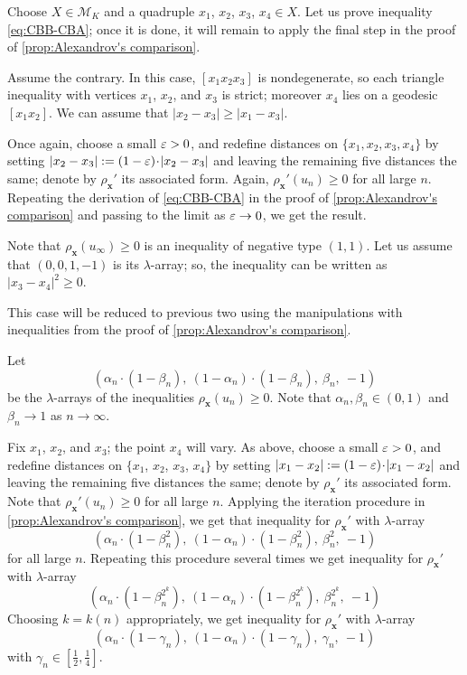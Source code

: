 \documentclass[a4paper,10pt]{article}
\begin{document}
Choose $X\in \mathcal{M}_K$ and a quadruple $x_1$, $x_2$, $x_3$, $x_4\in X$.
Let us prove inequality \ref{eq:CBB-CBA};
once it is done, it will remain to apply the final step in the proof of \ref{prop:Alexandrov's comparison}.

Assume the contrary.
In this case, $[x_1x_2x_3]$ is nondegenerate, so each triangle inequality with vertices $x_1$, $x_2$, and $x_3$ is strict; moreover $x_4$ lies on a geodesic $[x_1x_2]$.
We can assume that $|x_2-x_3|\ge |x_1-x_3|$.

Once again, choose a small $\varepsilon>0$, and redefine distances on $\{x_1,x_2,x_3,x_4\}$ by setting $|x_2-x_3|:=(1-\eps)\cdot|x_2-x_3|$ and leaving the remaining five distances the same; denote by $\rho_{\bm{x}}'$ its associated form.
Again, $\rho_{\bm{x}}'(u_n)\ge0$ for all large $n$.
Repeating the derivation of \ref{eq:CBB-CBA} in the proof of \ref{prop:Alexandrov's comparison} and passing to the limit as $\varepsilon\to 0$, we get the result.

Note that $\rho_{\bm{x}}(u_\infty)\ge0$ is an inequality of negative type $(1,1)$.
Let us assume that $(0,0, 1,-1)$ is its $\lambda$-array;
so, the inequality can be written as $|x_3-x_4|^2\ge 0$.

This case will be reduced to previous two using the manipulations with inequalities from the proof of \ref{prop:Alexandrov's comparison}.

Let
\[(\alpha_n\cdot (1-\beta_n),\  (1-\alpha_n)\cdot(1-\beta_n),\  \beta_n,\ -1)\]
be the $\lambda$-arrays of the inequalities $\rho_{\bm{x}}(u_n)\ge 0$.
Note that $\alpha_n,\beta_n\in(0,1)$ and $\beta_n\to 1$ as $n\to\infty$.

Fix $x_1$, $x_2$, and $x_3$; the point $x_4$ will vary.
As above, choose a small $\varepsilon>0$, and redefine distances on $\{x_1$, $x_2$, $x_3$, $x_4\}$ by setting $|x_1-x_2|\z{\mathrel{:=}}(1-\eps)\cdot|x_1-x_2|$ and leaving the remaining five distances the same; denote by $\rho_{\bm{x}}'$ its associated form.
Note that $\rho_{\bm{x}}'(u_n)\ge0$ for all large $n$.
Applying the iteration procedure in \ref{prop:Alexandrov's comparison}, we get that inequality for $\rho_{\bm{x}}'$ with $\lambda$-array
\[(\alpha_n\cdot (1-\beta_n^2),\  (1-\alpha_n)\cdot(1-\beta_n^2),\  \beta_n^2,\ -1)\]
for all large $n$.
Repeating this procedure several times we get inequality for $\rho_{\bm{x}}'$ with $\lambda$-array
\[(\alpha_n\cdot (1-\beta_n^{2^k}),\  (1-\alpha_n)\cdot(1-\beta_n^{2^k}),\  \beta_n^{2^k},\ -1)\]
Choosing $k=k(n)$ appropriately, we get inequality for $\rho_{\bm{x}}'$ with $\lambda$-array
\[(\alpha_n\cdot (1-\gamma_n),\  (1-\alpha_n)\cdot(1-\gamma_n),\  \gamma_n,\ -1)\]
with $\gamma_n\in[\tfrac12,\tfrac14]$.
\end{document}
